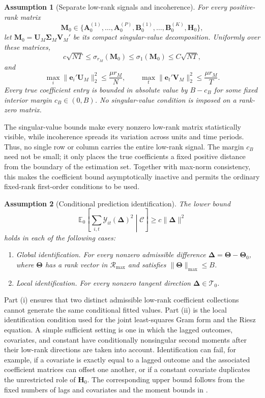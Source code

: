 \documentclass[11pt]{article}
\numberwithin{equation}{section}
\newtheorem{assumption}{Assumption}
\theoremstyle{remark}
\newcommand{\Ezero}{\mathbb E_0}
\newcommand{\be}{\bm e}
\newcommand{\bA}{\bm A}
\newcommand{\bB}{\bm B}
\newcommand{\bH}{\bm H}
\newcommand{\bM}{\bm M}
\newcommand{\bU}{\bm U}
\newcommand{\bV}{\bm V}
\newcommand{\bDelta}{\bm\Delta}
\newcommand{\bTheta}{\bm\Theta}
\newcommand{\bSigma}{\bm\Sigma}
\newcommand{\calR}{\mathcal R}
\newcommand{\calT}{\mathcal T}
\begin{document}
\begin{assumption}[Separate low-rank signals and incoherence]
\label{a:signal}
For every positive-rank matrix
$$
\bM_0
\in
\{\bA_0^{(1)},\ldots,\bA_0^{(P)},
\bB_0^{(1)},\ldots,\bB_0^{(K)},\bH_0\},
$$
let $\bM_0=\bU_M\bSigma_M\bV_M'$ be its compact singular-value decomposition. Uniformly over these matrices,
$$
c\sqrt{NT}
\le
\sigma_{r_M}(\bM_0)
\le
\sigma_1(\bM_0)
\le
C\sqrt{NT},
$$
and
$$
\max_i\|\be_i'\bU_M\|_2^2\le \frac{\mu r_M}{N},
\qquad
\max_t\|\be_t'\bV_M\|_2^2\le \frac{\mu r_M}{T}.
$$
Every true coefficient entry is bounded in absolute value by $B-c_B$ for some fixed interior margin $c_B\in(0,B)$. No singular-value condition is imposed on a rank-zero matrix.
\end{assumption}
The singular-value bounds make every nonzero low-rank matrix statistically visible, while incoherence spreads its variation across units and time periods. Thus, no single row or column carries the entire low-rank signal. The margin $c_B$ need not be small; it only places the true coefficients a fixed positive distance from the boundary of the estimation set. Together with max-norm consistency, this makes the coefficient bound asymptotically inactive and permits the ordinary fixed-rank first-order conditions to be used.

\begin{assumption}[Conditional prediction identification]
\label{a:identification}
The lower bound
\begin{equation}
\label{eq:conditional_identification}
\Ezero\!\left[
\sum_{i,t}\mathcal Y_{it}(\bDelta)^2
\middle|\mathscr C
\right]
\ge c\|\bDelta\|^2
\end{equation}
holds in each of the following cases:
\begin{enumerate}[label=(\roman*)]
\item \emph{Global identification.}
For every nonzero admissible difference
$\bDelta=\bTheta-\bTheta_0$, where $\bTheta$ has a rank
vector in $\calR_{\max}$ and satisfies
$\|\bTheta\|_{\max}\le B$.

\item \emph{Local identification.}
For every nonzero tangent direction
$\bDelta\in\calT_0$.
\end{enumerate}
\end{assumption}
Part (i) ensures that two distinct admissible low-rank coefficient
collections cannot generate the same conditional fitted values.
Part (ii) is the local identification condition used for the joint
least-squares Gram form and the Riesz equation. A simple sufficient setting is one in which the lagged outcomes, covariates, and constant have conditionally nonsingular second moments after their low-rank directions are taken into account. Identification can fail, for example, if a covariate is exactly equal to a lagged outcome and the associated coefficient matrices can offset one another, or if a constant covariate duplicates the unrestricted role of $\bH_0$. The corresponding upper bound follows from the fixed numbers of lags and covariates and the moment bounds in .
\end{document}
